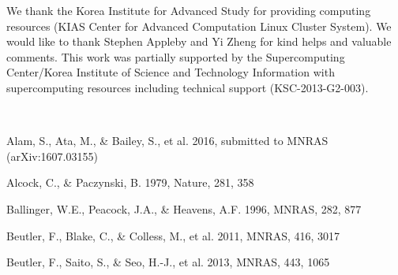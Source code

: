 \documentclass[iop]{emulateapj}
\begin{document}
We thank the Korea Institute for Advanced Study for providing computing resources (KIAS Center for Advanced Computation Linux Cluster System).
We would like to thank Stephen Appleby and Yi Zheng for kind helps and valuable comments.
This work was partially supported by the
Supercomputing Center/Korea Institute of Science and
Technology Information with supercomputing resources
including technical support (KSC-2013-G2-003).

\appendix

\

\begin{thebibliography}{}


Alam, S., Ata, M., \& Bailey, S., et al. 2016,
submitted to MNRAS (arXiv:1607.03155)


Alcock, C., \& Paczynski, B. 1979, Nature, 281, 358  




Ballinger, W.E., Peacock, J.A., \& Heavens, A.F. 1996, MNRAS, 282, 877  



Beutler, F., Blake, C., \& Colless, M., et al. 2011, MNRAS, 416, 3017

Beutler, F., Saito, S., \& Seo, H.-J., et al. 2013, MNRAS, 443, 1065


\end{thebibliography}
\end{document}
